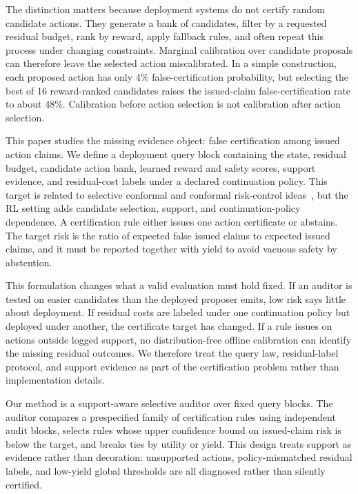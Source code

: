 \documentclass[letterpaper]{article}
\begin{document}
The distinction matters because deployment systems do not certify random
candidate actions. They generate a bank of candidates, filter by a requested
residual budget, rank by reward, apply fallback rules, and often repeat this
process under changing constraints. Marginal calibration over candidate
proposals can therefore leave the selected action miscalibrated. In a simple
construction, each proposed action has only 4\% false-certification probability,
but selecting the best of 16 reward-ranked candidates raises the issued-claim
false-certification rate to about 48\%. Calibration before action selection is
not calibration after action selection.

This paper studies the missing evidence object: false certification among
issued action claims. We define a deployment query block containing the state,
residual budget, candidate action bank, learned reward and safety scores,
support evidence, and residual-cost labels under a declared continuation
policy. This target is related to selective conformal and conformal risk-control
ideas~\cite{bao2025cap,angelopoulos2025crc}, but the RL setting adds candidate
selection, support, and continuation-policy dependence. A certification rule
either issues one action certificate or abstains.
The target risk is the ratio of expected false issued claims to expected issued
claims, and it must be reported together with yield to avoid vacuous safety by
abstention.

This formulation changes what a valid evaluation must hold fixed. If an auditor
is tested on easier candidates than the deployed proposer emits, low risk says
little about deployment. If residual costs are labeled under one continuation
policy but deployed under another, the certificate target has changed. If a
rule issues on actions outside logged support, no distribution-free offline
calibration can identify the missing residual outcomes. We therefore treat the
query law, residual-label protocol, and support evidence as part of the
certification problem rather than implementation details.

Our method is a support-aware selective auditor over fixed query blocks. The
auditor compares a prespecified family of certification rules using independent
audit blocks, selects rules whose upper confidence bound on issued-claim risk
is below the target, and breaks ties by utility or yield. This design treats
support as evidence rather than decoration: unsupported actions, policy-mismatched
residual labels, and low-yield global thresholds are all diagnosed rather than
silently certified.
\end{document}
